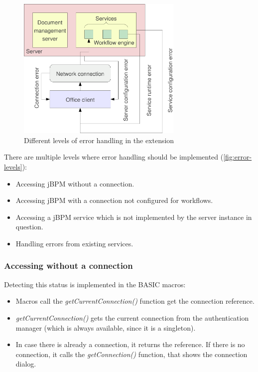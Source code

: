 \begin{figure}[H]
\centering
\includegraphics[width=300px,keepaspectratio]{error-levels.pdf}
\caption{Different levels of error handling in the extension}
\label{fig:error-levels}
\end{figure}

There are multiple levels where error handling should be implemented
(\autoref{fig:error-levels}):

\begin{itemize}
\item Accessing jBPM without a connection.
\item Accessing jBPM with a connection not configured for workflows.
\item Accessing a jBPM service which is not implemented by the server instance in question.
\item Handling errors from existing services.
\end{itemize}

\subsubsection*{Accessing without a connection}

Detecting this status is implemented in the BASIC macros:

\begin{itemize}
\item Macros call the \emph{getCurrentConnection()} function get the connection reference.
\item \emph{getCurrentConnection()} gets the current connection from the authentication manager (which is always available, since it is a singleton).
\item In case there is already a connection, it returns the reference. If there is no connection, it calls the \emph{getConnection()} function, that shows the connection dialog.
\end{itemize}

